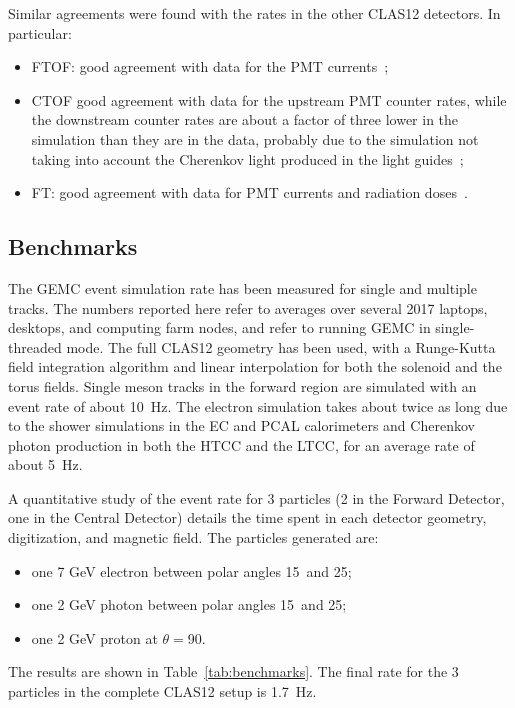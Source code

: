 Similar agreements were found with the rates in the other CLAS12 detectors. In particular:

\begin{itemize}
	\item FTOF: good agreement with data for the PMT currents~\cite{ftof-nim};
	\item CTOF good agreement with data for the upstream PMT counter rates, while the downstream counter rates
	  are about a factor of three lower in the simulation than they are in the data, probably due to the simulation
          not taking into account the Cherenkov light produced in the light guides~\cite{ctof-nim};
	\item FT: good agreement with data for PMT currents and radiation doses~\cite{ft-nim}.
\end{itemize}


\subsection{Benchmarks}

The GEMC event simulation rate has been measured for single and multiple tracks. The numbers reported here
refer to averages over several 2017 laptops, desktops, and computing farm nodes, and refer to running GEMC in
single-threaded mode. The full CLAS12 geometry has been used, with a Runge-Kutta field integration algorithm
and linear interpolation for both the solenoid and the torus fields. Single meson tracks in the forward region are
simulated with an event rate of about 10~Hz. The electron simulation takes about twice as long due to the shower
simulations in the EC and PCAL calorimeters and Cherenkov photon production in both the HTCC and the LTCC, for
an average rate of about 5~Hz.

A quantitative study of the event rate for 3 particles (2 in the Forward Detector, one in the Central Detector)
details the time spent in each detector geometry, digitization, and magnetic field. The particles generated are:

\begin{itemize}
	\item one 7 GeV electron between polar angles 15\mdeg \ and 25\mdeg;
	\item one 2 GeV photon between polar angles 15\mdeg \ and 25\mdeg;
	\item one 2 GeV proton at $\theta=$90\mdeg.
\end{itemize}

The results are shown in Table~\ref{tab:benchmarks}. The final rate for the 3 particles in the complete CLAS12 setup
is 1.7~Hz.

